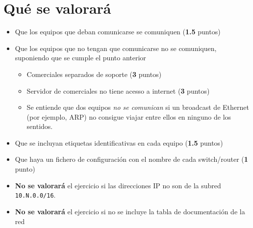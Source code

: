 \section{Qué se valorará}
\begin{itemize}
\item Que los equipos que deban comunicarse se comuniquen (\textbf{1.5} puntos)
\item Que los equipos que no tengan que comunicarse no se comuniquen, suponiendo que se cumple el punto anterior
  \begin{itemize}
  \item Comerciales separados de soporte (\textbf{3} puntos)
  \item Servidor de comerciales no tiene acesso a internet (\textbf{3} puntos)
  \item Se entiende que dos equipos \textit{no se comunican} si un broadcast de Ethernet (por ejemplo, ARP) no consigue viajar entre ellos en ninguno de los sentidos.
  \end{itemize}
\item Que se incluyan etiquetas identificativas en cada equipo (\textbf{1.5} puntos)  
\item Que haya un fichero de configuración con el nombre de cada switch/router (\textbf{1} punto)
\item \textbf{No se valorará} el ejercicio si las direcciones IP no son de la subred \texttt{10.N.0.0/16}.
\item \textbf{No se valorará} el ejercicio si no se incluye la tabla de documentación de la red
\end{itemize}




